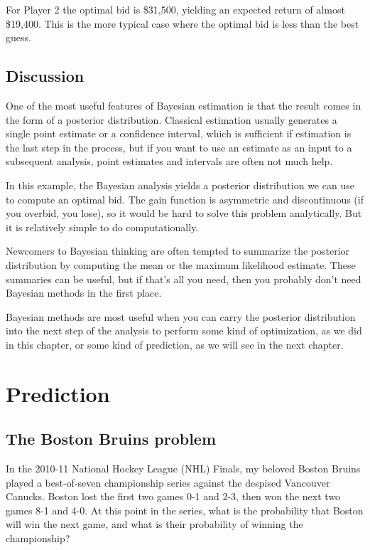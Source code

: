 \documentclass[12pt]{book}
\begin{document}
For Player 2 the optimal bid is \$31,500, yielding an expected
return of almost \$19,400.  This is the more typical case where
the optimal bid is less than the best guess.


\section{Discussion}

One of the most useful features of Bayesian estimation is that the
result comes in the form of a posterior distribution.  Classical
estimation usually generates a single point estimate or a confidence
interval, which is sufficient if estimation is the last step in the
process, but if you want to use an estimate as an input to a
subsequent analysis, point estimates and intervals are often not much
help.

In this example, the Bayesian analysis yields a posterior distribution
we can use to compute an optimal bid.  The gain function is asymmetric
and discontinuous (if you overbid, you lose), so it would be hard to
solve this problem analytically.  But it is relatively simple to do
computationally.

Newcomers to Bayesian thinking are often tempted to summarize the
posterior distribution by computing the mean or the maximum
likelihood estimate.  These summaries can be useful, but if that's
all you need, then you probably don't need Bayesian methods in the
first place.

Bayesian methods are most useful when you can carry the posterior
distribution into the next step of the analysis to perform some
kind of optimization, as we did in this chapter, or some kind of
prediction, as we will see in the next chapter.



\chapter{Prediction}
\label{prediction}

\section{The Boston Bruins problem}

In the 2010-11 National Hockey League (NHL) Finals, my beloved Boston
Bruins played a best-of-seven championship series against the despised
Vancouver Canucks.  Boston lost the first two games 0-1 and 2-3, then
won the next two games 8-1 and 4-0.  At this point in the series, what
is the probability that Boston will win the next game, and what is
their probability of winning the championship?
\end{document}
